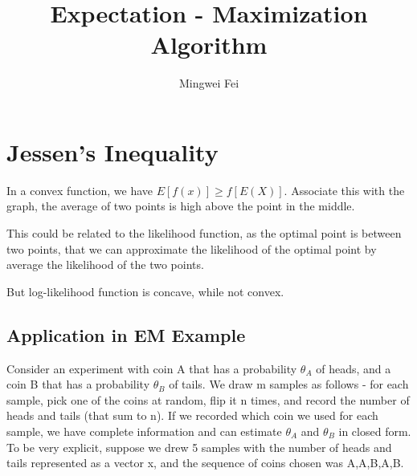 \documentclass[11pt]{article} %
\title{Expectation - Maximization Algorithm}
\author{Mingwei Fei}
\begin{document}
\maketitle

\section{Jessen's Inequality}
In a convex function, we have $E[f(x)] \geq f[E(X)]$. Associate this with the graph, the average of two points is high above the point in the middle.

This could be related to the likelihood function, as the optimal point is between two points, that we can approximate the likelihood of the optimal point by average the likelihood of the two points.

But log-likelihood function is concave, while not convex. 

\subsection{Application in EM Example}

Consider an experiment with coin A that has a probability $\theta_A$ of heads, and a coin B that has a probability $\theta_B$ of tails. We draw m samples as follows - for each sample, pick one of the coins at random, flip it n times, and record the number of heads and tails (that sum to n). If we recorded which coin we used for each sample, we have complete information and can estimate $\theta_A$ and $\theta_B$ in closed form. To be very explicit, suppose we drew 5 samples with the number of heads and tails represented as a vector x, and the sequence of coins chosen was A,A,B,A,B. 
\end{document}
